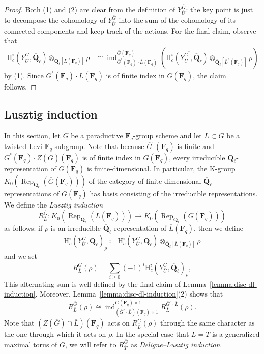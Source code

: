 \documentclass[reqno]{amsart}
\numberwithin{equation}{subsection}
\newcommand{\F}{\mathbf{F}}
\newcommand{\Q}{\mathbf{Q}}
\newcommand{\ol}[1]{\overline{#1}}
\newcommand{\co}{\colon}
\DeclareMathOperator{\Rep}{Rep}
\DeclareMathOperator{\ind}{ind}
\newcommand{\rH}{\ensuremath{\mathrm{H}}\xspace}
\newcommand{\bF}{\mathbf{F}}
\theoremstyle{remark}
\numberwithin{equation}{subsection}
\numberwithin{figure}{subsection}
\begin{document}
\begin{proof}
    Both (1) and (2) are clear from the definition of $Y_{\ol U}^{\ol G}$: the key point is just to decompose the cohomology of $Y_{\ol U}^{\ol G}$ into the sum of the cohomology of its connected components and keep track of the actions. For the final claim, observe that
    \begin{align*}
    \rH_c^i(Y_{\ol U}^{\ol G}, \ol\Q_\ell) \otimes_{\ol\Q_\ell[\ol L(\F_q)]} \rho &\cong \ind_{\ol G^\circ(\F_q) \cdot \ol L(\F_q)}^{\ol G(\F_q)} \left(\rH_c^i(Y_{\ol U}^{\ol G^\circ}, \ol\Q_\ell) \otimes_{\ol\Q_\ell[\ol L^\circ(\F_q)]} \rho\right)
    \end{align*}
    by (1). Since $\ol G^\circ(\F_q) \cdot \ol L(\F_q)$ is of finite index in $\ol G(\F_q)$, the claim follows.
\end{proof}


\subsection{Lusztig induction}\label{ss:lusztig-ind}
In this section, let $\ol G$ be a paraductive $\F_q$-group scheme and let $\ol L \subset \ol G$ be a twisted Levi $\F_q$-subgroup. Note that because $\ol G^\circ(\F_q)$ is finite and $\ol G^\circ(\F_q) \cdot Z(\ol G)(\F_q)$ is of finite index in $\ol G(\F_q)$, every irreducible $\ol\Q_\ell$-representation of $\ol G(\F_q)$ is finite-dimensional. In particular, the K-group $K_0(\Rep_{\ol\Q_\ell}(\ol G(\F_q)))$ of the category of finite-dimensional $\ol\Q_\ell$-representations of $\ol G(\F_q)$ has basis consisting of the irreducible representations. We define the \emph{Lusztig induction} 
\[
R_{\ol L}^{\ol G}\co K_0(\Rep_{\ol\Q_\ell}(\ol L(\F_q))) \to K_0(\Rep_{\ol\Q_\ell}(\ol G(\F_q)))
\]
as follows: if $\rho$ is an irreducible $\ol\Q_\ell$-representation of $\ol L(\F_q)$, then we define
\[
\rH_c^i(Y_{\ol U}^{\ol G}, \ol\Q_\ell)_\rho \coloneqq \rH_c^i(Y_{\ol U}^{\ol G}, \ol\Q_\ell) \otimes_{\ol\Q_\ell[\ol L(\F_q)]} \rho
\]
and we set
\[
R_{\ol L}^{\ol G}(\rho) = \sum_{i \geq 0} (-1)^i \rH_c^i(Y_{\ol U}^{\ol G}, \ol\Q_\ell)_\rho,
\]
This alternating sum is well-defined by the final claim of Lemma~\ref{lemma:disc-dl-induction}. Moreover, Lemma~\ref{lemma:disc-dl-induction}(2) shows that
\[
R_{\ol L}^{\ol G}(\rho) \cong \ind_{(\ol G^\circ\cdot \ol L)(\F_q) \times 1}^{\ol G(\F_q) \times 1} R_{\ol L}^{\ol G^\circ \cdot \ol L}(\rho).
\]
Note that $(Z(\ol G) \cap \ol L)(\bF_q)$ acts on $R_{\ol L}^{\ol G}(\rho)$ through the same character as the one through which it acts on $\rho$. In the special case that $\ol L = \ol T$ is a generalized maximal torus of $\ol G$, we will refer to $R_{\ol T}^{\ol G}$ as \emph{Deligne--Lusztig induction}.
\end{document}
